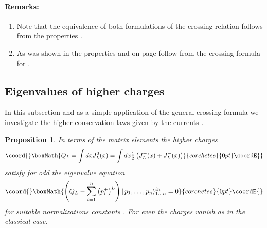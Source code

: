 \documentclass[a4paper,a4paper]{article}
\newtheorem{proposition}[theorem]{Proposition}
\begin{document}
\paragraph{Remarks:}

\begin{enumerate}
\item  Note that the equivalence of both formulations of the crossing
relation follows from the properties \coordHE{}.

\item  As was shown in \cite{BFKZ} the properties \coordHE{} and \coordHE{} on page 
\pageref{p} follow from the crossing formula for \coordHE{}.
\end{enumerate}

\subsection{Eigenvalues of higher charges}

In this subsection and as a simple application of the general crossing
formula we investigate the higher conservation laws given by the currents \coordHE{}.

\begin{proposition}
In terms of the matrix elements \newline
{}\coordHE{} the higher charges 
\[\coord{}\boxMath{
Q_{L}=\int dxJ_{L}^{0}(x)=\int dx\tfrac{1}{2}\left(
J_{L}^{+}(x)+J_{L}^{-}(x)\right) 
}{corchetes}{0pt}\coordE{}\]
satisfy for odd \coordHE{} the eigenvalue equation 
\[\coord{}\boxMath{
\left( Q_{L}-\sum_{i=1}^{n}\left( p_{i}^{+}\right) ^{L}\right)
|\,p_{1},\dots ,p_{n}\rangle _{1\dots n}^{in}=0 
}{corchetes}{0pt}\coordE{}\]
for suitable normalizations constants \coordHE{}. For even \coordHE{} the
charges vanish as in the classical case.
\end{proposition}
\end{document}
